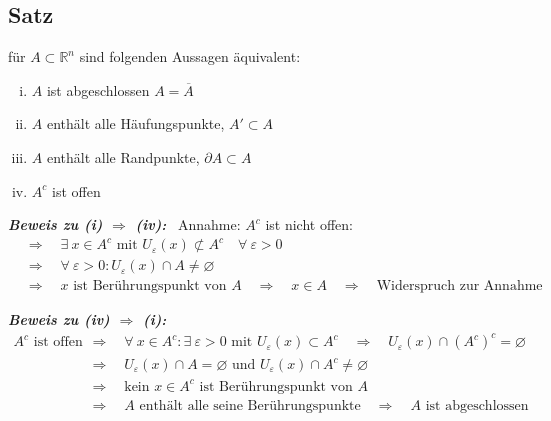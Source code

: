 \documentclass[11pt,a4paper]{book}
\newcommand {\Rn}	{\mathbb{R}^n}
\newcommand{\1}    	{\mathbbm{1}}
\newcommand{\mitt}	{\textrm{ mit }}
\newcommand{\Beweis}[1][Beweis]
{\begin{mdframed}[backgroundcolor=gray!10,linewidth=0pt]\noindent\textit{\textbf{{#1}:}}~}
\newcommand{\QED}	{\end{mdframed}}
\begin{document}
\subsection{Satz}
für \(A \subset \Rn\) sind folgenden Aussagen äquivalent:
\begin{enumerate}[(i)]
	\item \(A\) ist abgeschlossen \(A = \overline{A}\)
	\item \(A\) enthält alle Häufungspunkte, \(A' \subset A\)
	\item \(A\) enthält alle Randpunkte, \(\partial A \subset A\)
	\item \(A^c\) ist offen
\end{enumerate}
\Beweis[Beweis zu (i) \(\Rightarrow\) (iv)] Annahme: \(A^c\) ist nicht offen:
\begin{align*}
	&\Rightarrow\quad \exists~ x \in A^c \mitt U_\varepsilon(x) \not\subset A^c \quad \forall~ \varepsilon > 0 \\
	&\Rightarrow\quad \forall~ \varepsilon > 0 : U_\varepsilon(x) \cap A \neq \varnothing\\
	&\Rightarrow\quad x \textrm{ ist Berührungspunkt von }A \quad\Rightarrow\quad x \in A \quad\Rightarrow\quad \textrm{Widerspruch zur Annahme}
\end{align*}\QED

\Beweis[Beweis zu (iv) \(\Rightarrow\) (i)] \begin{align*}
	A^c \textrm{ ist offen} \quad&\Rightarrow\quad
	\forall~ x \in A^c : \exists~ \varepsilon > 0 \mitt U_\varepsilon(x) \subset A^c \quad\Rightarrow\quad U_\varepsilon(x) \cap \left(A^c\right)^c = \varnothing \\
	&\Rightarrow\quad  U_\varepsilon(x) \cap A = \varnothing \textrm{ und }  U_\varepsilon(x) \cap A^c \neq \varnothing \\
	&\Rightarrow\quad \textrm{kein }x\in A^c\textrm{ ist Berührungspunkt von }A\\
	&\Rightarrow\quad A \textrm{ enthält alle seine Berührungspunkte} \quad\Rightarrow\quad A \textrm{ ist abgeschlossen}
\end{align*}\QED
\end{document}

